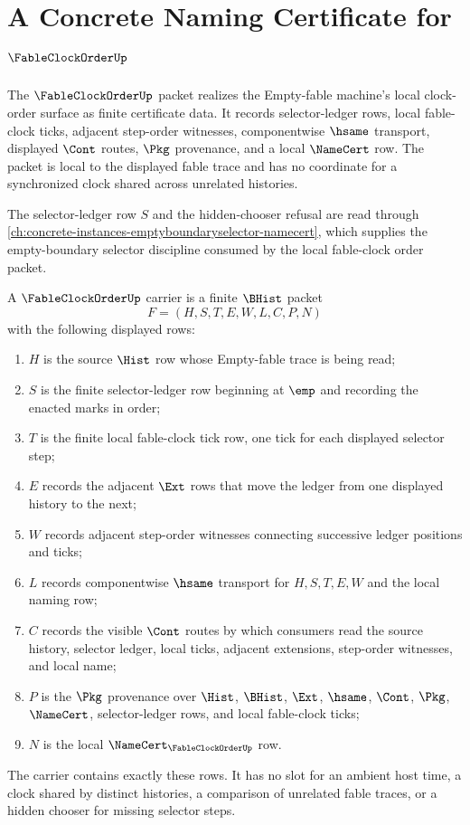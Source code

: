\chapter{A Concrete Naming Certificate for $\FableClockOrderUp$}
\label{ch:concrete-instances-fableclockorder-namecert}

The $\FableClockOrderUp$ packet realizes the Empty-fable machine's local clock-order surface as finite certificate data. It records selector-ledger rows, local fable-clock ticks, adjacent step-order witnesses, componentwise $\hsame$ transport, displayed $\Cont$ routes, $\Pkg$ provenance, and a local $\NameCert$ row. The packet is local to the displayed fable trace and has no coordinate for a synchronized clock shared across unrelated histories.

The selector-ledger row $S$ and the hidden-chooser refusal are read through \autoref{ch:concrete-instances-emptyboundaryselector-namecert}, which supplies the empty-boundary selector discipline consumed by the local fable-clock order packet.

\begin{definition}
\label{def:fable-clock-order-carrier}
A $\FableClockOrderUp$ carrier is a finite $\BHist$ packet
$$
F=(H,S,T,E,W,L,C,P,N)
$$
with the following displayed rows:
\begin{enumerate}
\item $H$ is the source $\Hist$ row whose Empty-fable trace is being read;
\item $S$ is the finite selector-ledger row beginning at $\emp$ and recording the enacted marks in order;
\item $T$ is the finite local fable-clock tick row, one tick for each displayed selector step;
\item $E$ records the adjacent $\Ext$ rows that move the ledger from one displayed history to the next;
\item $W$ records adjacent step-order witnesses connecting successive ledger positions and ticks;
\item $L$ records componentwise $\hsame$ transport for $H,S,T,E,W$ and the local naming row;
\item $C$ records the visible $\Cont$ routes by which consumers read the source history, selector ledger, local ticks, adjacent extensions, step-order witnesses, and local name;
\item $P$ is the $\Pkg$ provenance over $\Hist$, $\BHist$, $\Ext$, $\hsame$, $\Cont$, $\Pkg$, $\NameCert$, selector-ledger rows, and local fable-clock ticks;
\item $N$ is the local $\NameCert_{\FableClockOrderUp}$ row.
\end{enumerate}
The carrier contains exactly these rows. It has no slot for an ambient host time, a clock shared by distinct histories, a comparison of unrelated fable traces, or a hidden chooser for missing selector steps.
\end{definition}

